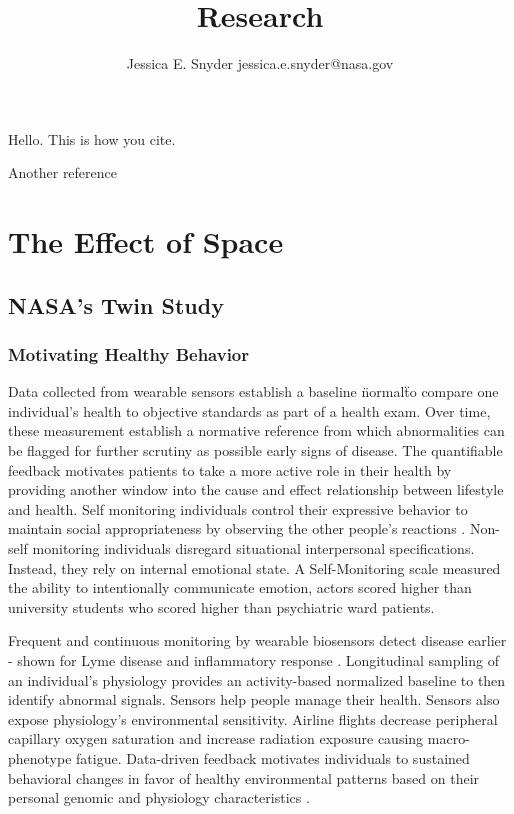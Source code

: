\documentclass[a4paper, 11pt]{article}
\begin{document}
\author{Jessica E. Snyder jessica.e.snyder@nasa.gov}
\title{ Research}
\maketitle

\tableofcontents


   
   Hello. This is how you cite. \cite{gustafsson2016best}
   
   Another reference \cite{hamid2015surface}
   
    \section{The Effect of Space}
    \subsection{NASA's Twin Study}
    
    \subsubsection{Motivating Healthy Behavior}
    Data collected from wearable sensors establish a baseline \"normal\" to compare one individual's health to objective standards as part of a health exam. Over time, these measurement establish a normative reference from which abnormalities can be flagged for further scrutiny as possible early signs of disease. The quantifiable feedback motivates patients to take a more active role in their health by providing another window into the cause and effect relationship between lifestyle and health. 
    Self monitoring individuals control their expressive behavior to maintain social appropriateness by observing the other people's reactions  \cite{snyder1974self}. Non-self monitoring individuals disregard situational interpersonal specifications. Instead, they rely on internal emotional state. A Self-Monitoring scale measured the ability to intentionally communicate emotion, actors scored higher than university students who scored higher than psychiatric ward patients.
    
    Frequent and continuous monitoring by wearable biosensors detect disease earlier - shown for Lyme disease and inflammatory response \cite{li2017digital}. Longitudinal sampling of an individual's physiology provides an activity-based normalized baseline to then identify abnormal signals. Sensors help people manage their health. Sensors also expose physiology's environmental sensitivity.  Airline flights decrease peripheral capillary oxygen saturation and increase radiation exposure causing macro-phenotype fatigue. 
    Data-driven feedback motivates individuals to sustained behavioral changes in favor of healthy environmental patterns based on their personal genomic and physiology characteristics \cite{kellogg2018personal}. 
    
\end{document}
